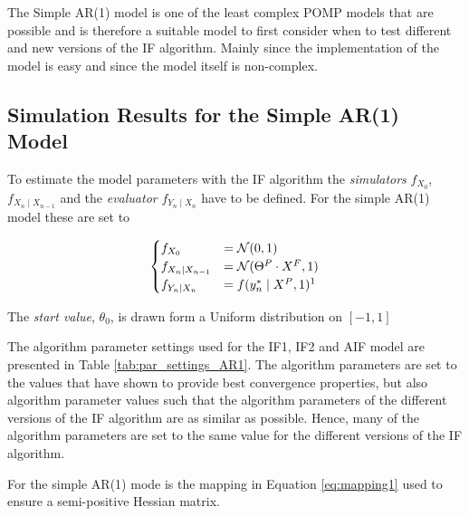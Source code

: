 \documentclass[twoside,openright]{report}
\begin{document}
The Simple AR(1) model is one of the least complex POMP models that are possible and is therefore a suitable model to first consider when to test different and new versions of the IF algorithm. Mainly since the implementation of the model is easy and since the model itself is non-complex. 

\subsection{Simulation Results for the Simple AR(1) Model}


To estimate the model parameters with the IF algorithm the \textit{simulators} $f_{X_0}$, $f_{X_n \mid X_{n-1}}$ and the \textit{evaluator} $f_{Y_n \mid X_n}$ have to be defined. For the simple AR(1) model these are set to 

\begin{align} \label{eq:simple_AR_model}
\begin{cases}
    f_{X_0} &= \mathcal{N}(0, 1) \\
    f_{X_n \mid X_{n-1}} &= \mathcal{N}(\Theta^P \cdot X^F,1) \\
    f_{Y_n \mid X_n} &= f(y^{*}_n \mid X^P , 1) \footnotemark
\end{cases}
\end{align}


The \textit{start value}, $\theta_0$, is drawn form a Uniform distribution on $[ -1 ,  1 ]$

The algorithm parameter settings used for the IF1, IF2  and AIF model are presented in Table \ref{tab:par_settings_AR1}. The algorithm parameters are set to the values that have shown to provide best convergence properties, but also algorithm parameter values such that the algorithm parameters of the different versions of the IF algorithm are as similar as possible. Hence, many of the algorithm parameters are set to the same value for the different versions of the IF algorithm. 

For the simple AR(1) mode is the mapping in Equation \ref{eq:mapping1} used to ensure a semi-positive Hessian matrix. 
\end{document}
